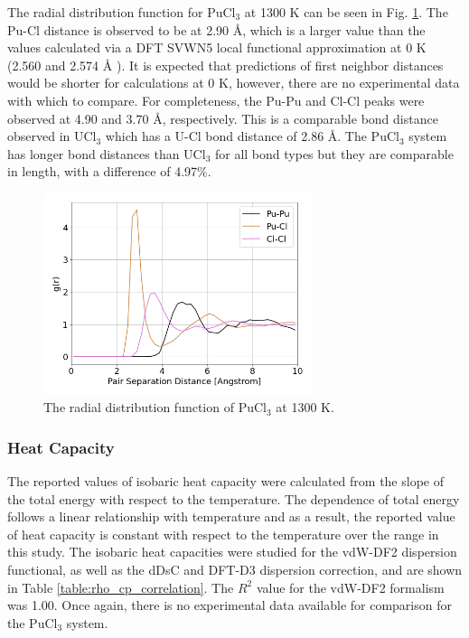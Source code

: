 \documentclass[review]{elsarticle}
\begin{document}
The radial distribution function for PuCl$_3$ at 1300 K can be seen in Fig. \ref{fig:rdf_pucl3}. The Pu-Cl distance is observed to be at 2.90 {\AA}, which is a larger value than the values calculated via a DFT SVWN5 local functional approximation at 0 K (2.560 and 2.574 {\AA} \cite{buz2012dft}). It is expected that predictions of first neighbor distances would be shorter for calculations at 0 K, however, there are no experimental data with which to compare. For completeness, the Pu-Pu and Cl-Cl peaks were observed at 4.90 and 3.70 {\AA}, respectively. This is a comparable bond distance observed in UCl$_3$ which has a U-Cl bond distance of 2.86 {\AA}\cite{ANDERSSON2022153836}. The PuCl$_3$ system has longer bond distances than UCl$_3$ for all bond types but they are comparable in length, with a difference of 4.97\%.

\begin{figure}[h!]
 \centering
 \includegraphics[width=0.7\textwidth]{rdf_pucl3_1300K.png} 
 \caption{The radial distribution function of PuCl$_3$ at 1300 K.}
 \label{fig:rdf_pucl3}
\end{figure}

\subsubsection{Heat Capacity}
The reported values of isobaric heat capacity were calculated from the slope of the total energy with respect to the temperature. The dependence of total energy follows a linear relationship with temperature and as a result, the reported value of heat capacity is constant with respect to the temperature over the range in this study. The isobaric heat capacities were studied for the vdW-DF2 dispersion functional, as well as the dDsC and DFT-D3 dispersion correction, and are shown in Table \ref{table:rho_cp_correlation}. The $R^2$ value for the vdW-DF2 formalism was 1.00. Once again, there is no experimental data available for comparison for the PuCl$_3$ system. 
\end{document}
